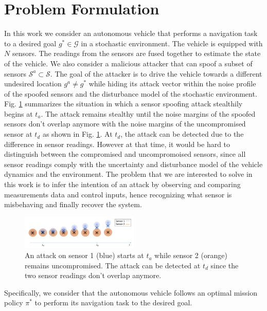 \documentclass[letterpaper, 10 pt, conference]{ieeeconf}  %
\begin{document}
\section{Problem Formulation}\label{sec:problem}
In this work we consider an autonomous vehicle that performs a navigation task to a desired goal $g^* \in \mathcal G$ in a stochastic environment. The vehicle is equipped with $N$ sensors. The readings from the sensors are fused together to estimate the state of the vehicle. We also consider a malicious attacker that can spoof a subset of sensors $\mathcal{S}^a \subset \mathcal{S}$. The goal of the attacker is to drive the vehicle towards a different undesired location $g^a \neq g^*$ while hiding its attack vector within the noise profile of the spoofed sensors and the disturbance model of the stochastic environment.  Fig. \ref{fig:sensor_spoofing} summarizes the situation in which a sensor spoofing attack stealthily begins at $t_a$. The attack remains stealthy until the noise margins of the spoofed sensors don't overlap anymore with the noise margins of the uncompromised sensor at $t_d$ as shown in Fig. \ref{fig:sensor_spoofing}. At $t_d$, the attack can be detected due to the difference in sensor readings. However at that time, it would be hard to distinguish between the compromised and uncompromoised sensors, since all sensor readings comply with the uncertainty and disturbance model of the vehicle dynamics and the environment. The problem that we are interested to solve in this work is to infer the intention of an attack by observing and comparing measurements data and control inputs, hence recognizing what sensor is misbehaving and finally recover the system. 
\begin{figure}[h]
\centering
\includegraphics[width=0.5\textwidth]{sensor_spoofing}
\caption{An attack on sensor 1 (blue) starts at $t_a$ while sensor 2 (orange) remains uncompromised. The attack can be detected at $t_d$ since the two sensor readings don't overlap anymore.}
 \label{fig:sensor_spoofing}
\end{figure}
Specifically, we consider that the autonomous vehicle follows an optimal mission policy $\pi^*$ to perform its navigation task to the desired goal. 
\end{document}
